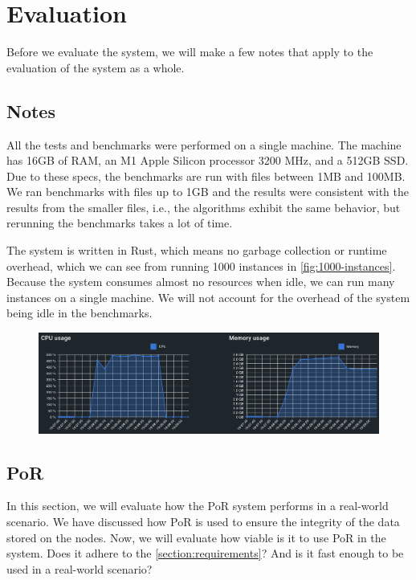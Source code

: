\chapter{Evaluation}
\label{chapter:evaluation}

Before we evaluate the system, we will make a few notes that apply to the evaluation of the system as a whole.

\section{Notes}

All the tests and benchmarks were performed on a single machine.
The machine has 16GB of RAM, an M1 Apple Silicon processor 3200 MHz, and a 512GB SSD.
Due to these specs, the benchmarks are run with files between 1MB and 100MB.
We ran benchmarks with files up to 1GB and the results were consistent with the results from the smaller files,
i.e., the algorithms exhibit the same behavior, but rerunning the benchmarks takes a lot of time.

The system is written in Rust, which means no garbage collection or runtime overhead,
which we can see from running 1000 instances in \autoref{fig:1000-instances}.
Because the system consumes almost no resources when idle,
we can run many instances on a single machine.
We will not account for the overhead of the system being idle in the benchmarks.

\begin{figure}
    \centering
    \includegraphics[width=350pt]{gfx/1000-instances.png}
    \label{fig:1000-instances}
\end{figure}

\section{PoR}

In this section, we will evaluate how the PoR system performs in a real-world scenario.
We have discussed how PoR is used to ensure the integrity of the data stored on the nodes.
Now, we will evaluate how viable is it to use PoR in the system.
Does it adhere to the \autoref{section:requirements}?
And is it fast enough to be used in a real-world scenario?

